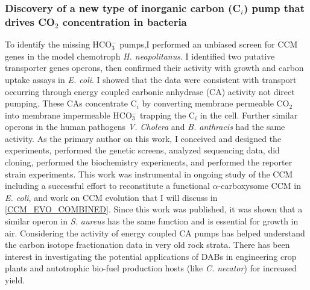 \documentclass{article}
\begin{document}
\subsubsection{Discovery of a new type of inorganic carbon (C$_i$) pump that drives CO$_2$ concentration in bacteria}
To identify the missing HCO$_{3}^{-}$ pumps,I performed an unbiased screen for CCM genes in the model chemotroph \textit{H. neapolitanus}.
I identified two putative transporter genes operons, then confirmed their activity with growth and carbon uptake assays in \textit{E. coli}. 
I showed that the data were consistent with transport occurring through energy coupled carbonic anhydrase (CA) activity not direct pumping.
These CAs concentrate C$_i$ by converting membrane permeable CO$_2$ into membrane impermeable HCO$_{3}^{-}$ trapping the C$_i$ in the cell.
Further similar operons in the human pathogens \textit{V. Cholera} and \textit{B. anthracis} had the same activity.
As the primary author on this work, I conceived and designed the experiments, performed the genetic screens, analyzed sequencing data, did cloning, performed the biochemistry experiments, and performed the reporter strain experiments.
This work was instrumental in ongoing study of the CCM including a successful effort to reconstitute a functional $\alpha$-carboxysome CCM in \textit{E. coli}, and work on CCM evolution that I will discuss in \ref{CCM_EVO_COMBINED}. 
Since this work was published, it was shown that a similar operon in \textit{S. aureus} has the same function and is essential for growth in air. 
Considering the activity of energy coupled CA pumps has helped understand the carbon isotope fractionation data in very old rock strata.
There has been interest in investigating the potential applications of DABs in engineering crop plants and autotrophic bio-fuel production hosts (like \textit{C. necator}) for increased yield.
%
\end{document}
